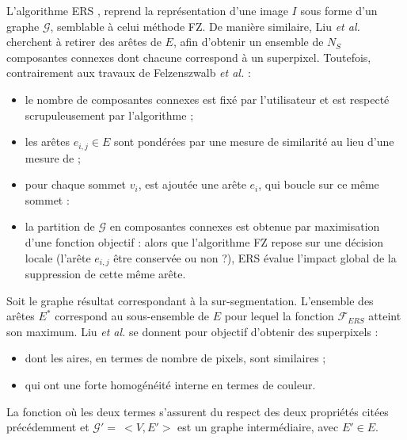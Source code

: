 L'algorithme ERS \cite{liu2011entropy}, reprend la représentation d'une image $I$ sous forme d'un graphe $\mathcal{G}$, semblable à celui  méthode FZ. De manière similaire, Liu \textit{et al.} \cite{liu2011entropy} cherchent à retirer des arêtes de $E$, afin d'obtenir un ensemble de $N_{S}$ composantes connexes dont chacune correspond à un superpixel. Toutefois, contrairement aux travaux de Felzenszwalb \textit{et al.} \cite{felzenszwalb2004efficient} : 
\begin{itemize}
\item le nombre de composantes connexes est fixé par l'utilisateur et est respecté scrupuleusement par l'algorithme ;
\item les arêtes $e_{i,j} \in E$ sont pondérées par une mesure de similarité au lieu d'une mesure de  ;
\item pour chaque sommet $v_{i}$, est ajoutée une arête $e_{i}$, qui boucle sur ce même sommet : 
\item la partition de $\mathcal{G}$ en composantes connexes est obtenue par maximisation d'une fonction objectif  : alors que l'algorithme FZ \cite{felzenszwalb2004efficient} repose sur une décision locale (l'arête $e_{i,j}$  être conservée ou non ?), ERS \cite{liu2011entropy} évalue l'impact global de la suppression de cette même arête.
\end{itemize}

Soit  le graphe résultat correspondant à la sur-segmentation. L'ensemble des arêtes $E^{*}$ correspond au sous-ensemble de $E$ pour lequel la fonction $\mathcal{F}_{ERS}$ atteint son maximum. Liu \textit{et al.} \cite{liu2011entropy} se donnent pour objectif d'obtenir des superpixels :
\begin{itemize}
\item dont les aires, en termes de nombre de pixels, sont similaires ;
\item qui ont une forte homogénéité interne en termes de couleur.  
\end{itemize}
La fonction  
où les deux termes  s'assurent du respect des deux propriétés citées précédemment et $\mathcal{G}' =\ <V,E'> $ est un graphe intermédiaire, avec $E' \in E$.  


